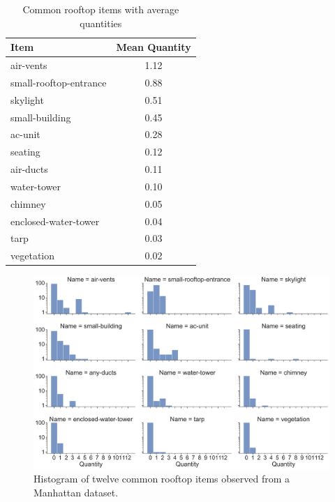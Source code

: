 \begin{table}[ht]
\centering
\caption{Common rooftop items with average quantities}
\label{table:roof_quantity}
\begin{tabular}{@{}lc@{}}
\toprule
Item                   & Mean Quantity \\ \midrule
air-vents              & 1.12          \\
small-rooftop-entrance & 0.88          \\
skylight               & 0.51          \\
small-building         & 0.45          \\
ac-unit                & 0.28          \\
seating                & 0.12          \\
air-ducts              & 0.11          \\
water-tower            & 0.10          \\
chimney                & 0.05          \\
enclosed-water-tower   & 0.04          \\
tarp                   & 0.03          \\
vegetation             & 0.02          \\ \bottomrule
\end{tabular}
\end{table}

\begin{figure}[ht!]
\centering
\includegraphics[width=.80\linewidth]{chapter_6_landingsim/figs/hist.pdf}
\caption[Histogram of twelve common rooftop items observed from a Manhattan dataset]{Histogram of twelve common rooftop items observed from a Manhattan dataset. }
\label{fig:ch6_histogram_sampling}
\end{figure}


